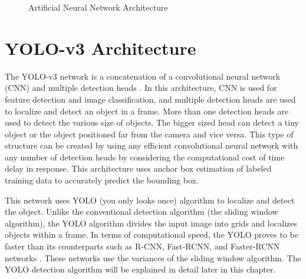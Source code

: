 \begin{figure}
    \centering
    \caption{Artificial Neural Network Architecture}
    \label{ANN_Arch}
\end{figure}

\section{YOLO-v3 Architecture}
The YOLO-v3 network is a concatenation of a convolutional neural network (CNN) and multiple detection heads \cite{yolov3}. In this architecture, CNN is used for feature detection and image classification, and multiple detection heads are used to localize and detect an object in a frame. More than one detection heads are used to detect the various size of objects. The bigger sized head can detect a tiny object or the object positioned far from the camera and vice versa. This type of structure can be created by using any efficient convolutional neural network with any number of detection heads by considering the computational cost of time delay in response. This architecture uses anchor box estimation of labeled training data to accurately predict the bounding box. 

This network uses YOLO (you only looks once) algorithm to localize and detect the object. Unlike the conventional detection algorithm (the sliding window algorithm), the YOLO algorithm divides the input image into grids and localizes objects within a frame. In terms of computational speed, the YOLO proves to be faster than its counterparts such as R-CNN, Fast-RCNN, and Faster-RCNN networks \cite{yolov3}. These networks use the variances of the sliding window algorithm. The YOLO detection algorithm will be explained in detail later in this chapter. 

